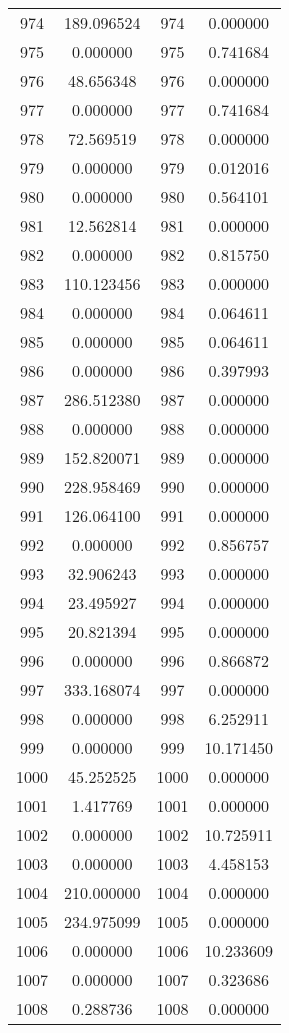 \documentclass[12pt]{article}
\begin{document}
\begin{longtable}{@{}cccc@{}}
974 & 189.096524 & 974 & 0.000000 \\
975 & 0.000000 & 975 & 0.741684 \\
976 & 48.656348 & 976 & 0.000000 \\
977 & 0.000000 & 977 & 0.741684 \\
978 & 72.569519 & 978 & 0.000000 \\
979 & 0.000000 & 979 & 0.012016 \\
980 & 0.000000 & 980 & 0.564101 \\
981 & 12.562814 & 981 & 0.000000 \\
982 & 0.000000 & 982 & 0.815750 \\
983 & 110.123456 & 983 & 0.000000 \\
984 & 0.000000 & 984 & 0.064611 \\
985 & 0.000000 & 985 & 0.064611 \\
986 & 0.000000 & 986 & 0.397993 \\
987 & 286.512380 & 987 & 0.000000 \\
988 & 0.000000 & 988 & 0.000000 \\
989 & 152.820071 & 989 & 0.000000 \\
990 & 228.958469 & 990 & 0.000000 \\
991 & 126.064100 & 991 & 0.000000 \\
992 & 0.000000 & 992 & 0.856757 \\
993 & 32.906243 & 993 & 0.000000 \\
994 & 23.495927 & 994 & 0.000000 \\
995 & 20.821394 & 995 & 0.000000 \\
996 & 0.000000 & 996 & 0.866872 \\
997 & 333.168074 & 997 & 0.000000 \\
998 & 0.000000 & 998 & 6.252911 \\
999 & 0.000000 & 999 & 10.171450 \\
1000 & 45.252525 & 1000 & 0.000000 \\
1001 & 1.417769 & 1001 & 0.000000 \\
1002 & 0.000000 & 1002 & 10.725911 \\
1003 & 0.000000 & 1003 & 4.458153 \\
1004 & 210.000000 & 1004 & 0.000000 \\
1005 & 234.975099 & 1005 & 0.000000 \\
1006 & 0.000000 & 1006 & 10.233609 \\
1007 & 0.000000 & 1007 & 0.323686 \\
1008 & 0.288736 & 1008 & 0.000000 \\

\end{longtable}
\end{document}
